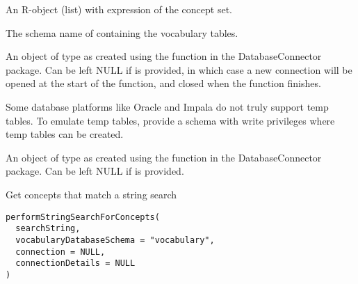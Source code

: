 \documentclass[a4paper]{book}
\begin{document}
\begin{Arguments}
\begin{ldescription}
\item[\code{conceptSetExpression}] An R-object (list) with expression of the concept set.

\item[\code{vocabularyDatabaseSchema}] The schema name of containing the vocabulary tables.

\item[\code{connection}] An object of type  as created using the
 function in the
DatabaseConnector package. Can be left NULL if 
is provided, in which case a new connection will be opened at the start
of the function, and closed when the function finishes.

\item[\code{tempEmulationSchema}] Some database platforms like Oracle and Impala do not truly support temp tables. To emulate temp 
tables, provide a schema with write privileges where temp tables can be created.

\item[\code{connectionDetails}] An object of type  as created using the
 function in the
DatabaseConnector package. Can be left NULL if  is
provided.
\end{ldescription}
\end{Arguments}
%
\begin{Description}\relax
Get concepts that match a string search
\end{Description}
%
\begin{Usage}
\begin{verbatim}
performStringSearchForConcepts(
  searchString,
  vocabularyDatabaseSchema = "vocabulary",
  connection = NULL,
  connectionDetails = NULL
)
\end{verbatim}
\end{Usage}
%
\end{document}
